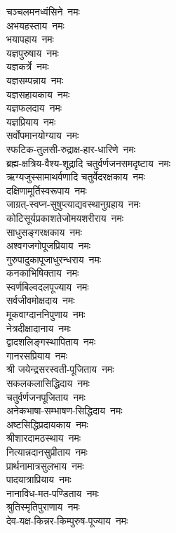 \begin{flushleft}
\begin{multicols}{2}
चञ्चलमनध्वंसिने~नमः\\
अभयहस्ताय~नमः\\
भयापहाय~नमः\\
यज्ञपुरुषाय~नमः\hfill{}\\
यज्ञकर्त्रे~नमः\\
यज्ञसम्पन्नाय~नमः\\
यज्ञसहायकाय~नमः\\
यज्ञफलदाय~नमः\\
यज्ञप्रियाय~नमः\\
सर्वोपमानयोग्याय~नमः\\
स्फटिक-तुलसी-रुद्राक्ष-हार-धारिणे~नमः\\
ब्रह्म-क्षत्रिय-वैश्य-शूद्रादि चतुर्वर्णजनसमदृष्टाय~नमः\\
ऋग्यजुस्सामाथर्वणादि चतुर्वेदरक्षकाय~नमः\\
दक्षिणामूर्तिस्वरूपाय~नमः\hfill{}\\
जाग्रत्-स्वप्न-सुषुप्त्याद्यवस्थानुग्रहाय~नमः\\
कोटिसूर्यप्रकाशतेजोमय\-शरीराय~नमः\\
साधुसङ्गरक्षकाय~नमः\\
अश्वगजगोपूजप्रियाय~नमः\\
गुरुपादुकापूजाधुरन्धराय~नमः\\
कनकाभिषिक्ताय~नमः\\
स्वर्णबिल्वदलपूज्याय~नमः\\
सर्वजीवमोक्षदाय~नमः\\
मूकवाग्दाननिपुणाय~नमः\\
नेत्रदीक्षादानाय~नमः\hfill{}\\
द्वादशलिङ्गस्थापिताय~नमः\\
गानरसप्रियाय~नमः\\
श्री जयेन्द्रसरस्वती-पूजिताय~नमः\\
सकलकलासिद्धिदाय~नमः\\
चतुर्वर्णजनपूजिताय~नमः\\
अनेकभाषा-सम्भाषण-सिद्धिदाय~नमः\\
अष्टसिद्धिप्रदायकाय~नमः\\
श्रीशारदामठस्थाय~नमः\\
नित्यान्नदानसुप्रीताय~नमः\\
प्रार्थनामात्रसुलभाय~नमः\hfill{}\\
पादयात्राप्रियाय~नमः\\
नानाविध-मत-पण्डिताय~नमः\\
श्रुतिस्मृतिपुराणाय~नमः\\
देव-यक्ष-किन्नर-किम्पुरुष-पूज्याय~नमः\\

\end{multicols}
\end{flushleft}

